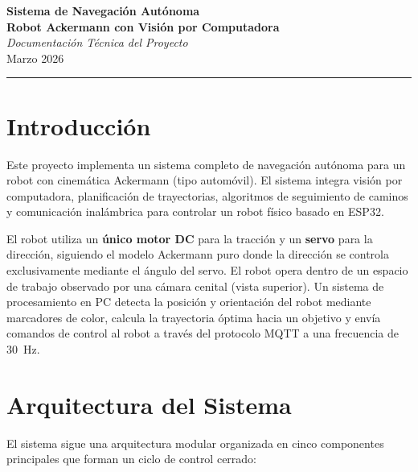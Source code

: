 \documentclass[11pt,a4paper]{article}
\begin{document}
\begin{center}
    \vspace*{1cm}
    {\Huge\bfseries\color{azulprincipal} Sistema de Navegación Autónoma}\\[0.5cm]
    {\Large\bfseries\color{azulsecundario} Robot Ackermann con Visión por Computadora}\\[0.8cm]
    {\large\itshape\color{gristexto} Documentación Técnica del Proyecto}\\[0.3cm]
    {\large\color{gristexto} Marzo 2026}\\[0.5cm]
    \textcolor{azullinea}{\rule{0.6\textwidth}{0.5pt}}
\end{center}
\vspace{0.5cm}

\section{Introducción}

Este proyecto implementa un sistema completo de navegación autónoma para un robot con cinemática Ackermann (tipo automóvil). El sistema integra visión por computadora, planificación de trayectorias, algoritmos de seguimiento de caminos y comunicación inalámbrica para controlar un robot físico basado en ESP32.

El robot utiliza un \textbf{único motor DC} para la tracción y un \textbf{servo} para la dirección, siguiendo el modelo Ackermann puro donde la dirección se controla exclusivamente mediante el ángulo del servo. El robot opera dentro de un espacio de trabajo observado por una cámara cenital (vista superior). Un sistema de procesamiento en PC detecta la posición y orientación del robot mediante marcadores de color, calcula la trayectoria óptima hacia un objetivo y envía comandos de control al robot a través del protocolo MQTT a una frecuencia de 30~Hz.

\section{Arquitectura del Sistema}

El sistema sigue una arquitectura modular organizada en cinco componentes principales que forman un ciclo de control cerrado:
\end{document}
